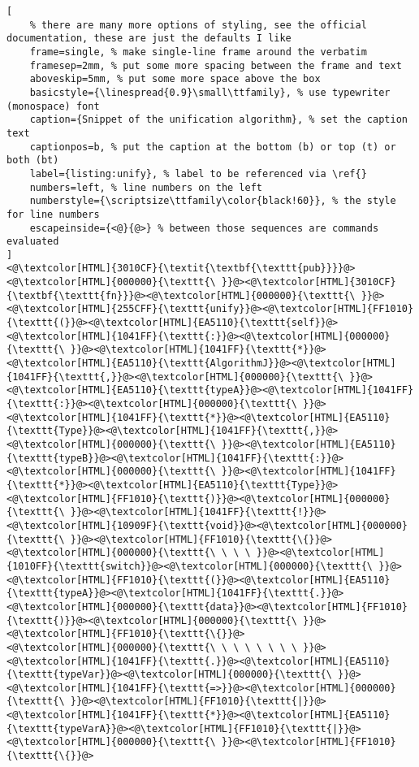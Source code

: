 \begin{lstlisting}[
	% there are many more options of styling, see the official documentation, these are just the defaults I like
	frame=single, % make single-line frame around the verbatim
	framesep=2mm, % put some more spacing between the frame and text
	aboveskip=5mm, % put some more space above the box
	basicstyle={\linespread{0.9}\small\ttfamily}, % use typewriter (monospace) font
	caption={Snippet of the unification algorithm}, % set the caption text
	captionpos=b, % put the caption at the bottom (b) or top (t) or both (bt)
    label={listing:unify}, % label to be referenced via \ref{}
	numbers=left, % line numbers on the left
	numberstyle={\scriptsize\ttfamily\color{black!60}}, % the style for line numbers
	escapeinside={<@}{@>} % between those sequences are commands evaluated
]
<@\textcolor[HTML]{3010CF}{\textit{\textbf{\texttt{pub}}}}@><@\textcolor[HTML]{000000}{\texttt{\ }}@><@\textcolor[HTML]{3010CF}{\textbf{\texttt{fn}}}@><@\textcolor[HTML]{000000}{\texttt{\ }}@><@\textcolor[HTML]{255CFF}{\texttt{unify}}@><@\textcolor[HTML]{FF1010}{\texttt{(}}@><@\textcolor[HTML]{EA5110}{\texttt{self}}@><@\textcolor[HTML]{1041FF}{\texttt{:}}@><@\textcolor[HTML]{000000}{\texttt{\ }}@><@\textcolor[HTML]{1041FF}{\texttt{*}}@><@\textcolor[HTML]{EA5110}{\texttt{AlgorithmJ}}@><@\textcolor[HTML]{1041FF}{\texttt{,}}@><@\textcolor[HTML]{000000}{\texttt{\ }}@><@\textcolor[HTML]{EA5110}{\texttt{typeA}}@><@\textcolor[HTML]{1041FF}{\texttt{:}}@><@\textcolor[HTML]{000000}{\texttt{\ }}@><@\textcolor[HTML]{1041FF}{\texttt{*}}@><@\textcolor[HTML]{EA5110}{\texttt{Type}}@><@\textcolor[HTML]{1041FF}{\texttt{,}}@><@\textcolor[HTML]{000000}{\texttt{\ }}@><@\textcolor[HTML]{EA5110}{\texttt{typeB}}@><@\textcolor[HTML]{1041FF}{\texttt{:}}@><@\textcolor[HTML]{000000}{\texttt{\ }}@><@\textcolor[HTML]{1041FF}{\texttt{*}}@><@\textcolor[HTML]{EA5110}{\texttt{Type}}@><@\textcolor[HTML]{FF1010}{\texttt{)}}@><@\textcolor[HTML]{000000}{\texttt{\ }}@><@\textcolor[HTML]{1041FF}{\texttt{!}}@><@\textcolor[HTML]{10909F}{\texttt{void}}@><@\textcolor[HTML]{000000}{\texttt{\ }}@><@\textcolor[HTML]{FF1010}{\texttt{\{}}@>
<@\textcolor[HTML]{000000}{\texttt{\ \ \ \ }}@><@\textcolor[HTML]{1010FF}{\texttt{switch}}@><@\textcolor[HTML]{000000}{\texttt{\ }}@><@\textcolor[HTML]{FF1010}{\texttt{(}}@><@\textcolor[HTML]{EA5110}{\texttt{typeA}}@><@\textcolor[HTML]{1041FF}{\texttt{.}}@><@\textcolor[HTML]{000000}{\texttt{data}}@><@\textcolor[HTML]{FF1010}{\texttt{)}}@><@\textcolor[HTML]{000000}{\texttt{\ }}@><@\textcolor[HTML]{FF1010}{\texttt{\{}}@>
<@\textcolor[HTML]{000000}{\texttt{\ \ \ \ \ \ \ \ }}@><@\textcolor[HTML]{1041FF}{\texttt{.}}@><@\textcolor[HTML]{EA5110}{\texttt{typeVar}}@><@\textcolor[HTML]{000000}{\texttt{\ }}@><@\textcolor[HTML]{1041FF}{\texttt{=>}}@><@\textcolor[HTML]{000000}{\texttt{\ }}@><@\textcolor[HTML]{FF1010}{\texttt{|}}@><@\textcolor[HTML]{1041FF}{\texttt{*}}@><@\textcolor[HTML]{EA5110}{\texttt{typeVarA}}@><@\textcolor[HTML]{FF1010}{\texttt{|}}@><@\textcolor[HTML]{000000}{\texttt{\ }}@><@\textcolor[HTML]{FF1010}{\texttt{\{}}@>

\end{lstlisting}
